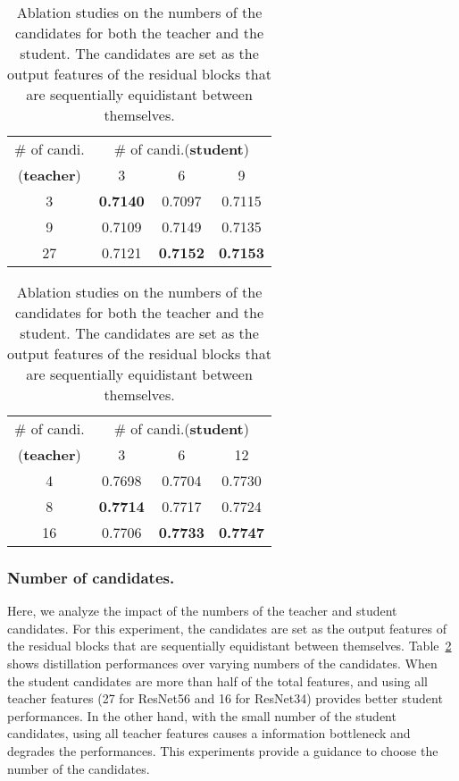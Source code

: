 \begin{table}[h]
\tabcolsep=0.2cm
\begin{subtable}{.48\textwidth}
\centering
\begin{tabular}{c|ccc}
\toprule
                          \# of candi.             & \multicolumn{3}{c}{\# of candi.(\textbf{student})} \\ \cmidrule{2-4} 
(\textbf{teacher}) & 3           & 6          & 9          \\ \midrule
3                                     & \textbf{0.7140}      & 0.7097     & 0.7115     \\
9                                     & 0.7109      & 0.7149     & 0.7135     \\
27                                    & 0.7121      & \textbf{0.7152}     & \textbf{0.7153}   \\ \bottomrule  
\end{tabular}
\caption{ResNet56  ResNet20}
\end{subtable}
\hspace{1em}
\begin{subtable}{.48\textwidth}
\centering
\begin{tabular}{c|ccc}
\toprule
                          \# of candi.             & \multicolumn{3}{c}{\# of candi.(\textbf{student})} \\ \cmidrule{2-4} 
 (\textbf{teacher})  & 3           & 6          & 12         \\ \midrule
4                                     & 0.7698      & 0.7704     & 0.7730     \\
8                                     & \textbf{0.7714}      & 0.7717     & 0.7724     \\
16                                    & 0.7706      & \textbf{0.7733}     & \textbf{0.7747}    \\ \bottomrule  
\end{tabular}
\caption{ResNet34  WRN-28-2}
\end{subtable}
\caption{Ablation studies on the numbers of the candidates for both the teacher and the student. The candidates are set as the output features of the residual blocks that are sequentially equidistant between themselves.}
\label{table:ablation_layer}
\end{table}

\subsubsection{Number of candidates.}
Here, we analyze the impact of the numbers of the teacher and student candidates. For this experiment, the candidates are set as the output features of the residual blocks that are sequentially equidistant between themselves. Table~\ref{table:ablation_layer} shows distillation performances over varying numbers of the candidates. When the student candidates are more than half of the total features, and using all teacher features (27 for ResNet56 and 16 for ResNet34) provides better student performances. In the other hand, with the small number of the student candidates, using all teacher features causes a information bottleneck and degrades the performances. This experiments provide a guidance to choose the number of the candidates.

